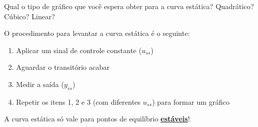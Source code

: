 \documentclass[a4paper,12pt]{exam}
\begin{document}
Qual o tipo de gráfico que você espera obter para a curva estática? Quadrático? Cúbico? Linear?


O procedimento para levantar a curva estática é o seguinte: 

\begin{enumerate}
    \item Aplicar um sinal de controle constante ($u_{ss}$)
    \item Aguardar o transitório acabar
    \item Medir a saída ($y_{ss}$)
    \item Repetir os itens 1, 2 e 3 (com diferentes $u_{ss}$) para formar um gráfico
\end{enumerate}

\begin{cuidado}{}{}
    A curva estática só vale para pontos de equilíbrio \textbf{\underline{estáveis}}!
\end{cuidado}

\newpage
\end{document}
